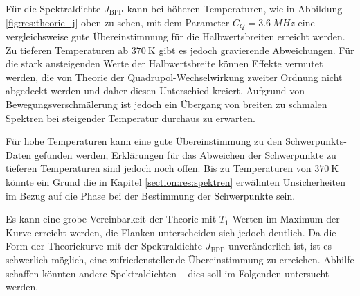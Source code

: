 Für die Spektraldichte $J_\text{BPP}$ kann bei höheren Temperaturen, wie in Abbildung \ref{fig:res:theorie_j} oben zu sehen, mit dem Parameter $C_Q = \SI{3.6}{MHz}$ eine vergleichsweise gute Übereinstimmung für die Halbwertsbreiten erreicht werden. Zu tieferen Temperaturen ab $\SI{370}{\kelvin}$ gibt es jedoch gravierende Abweichungen. Für die stark ansteigenden Werte der Halbwertsbreite können Effekte vermutet werden, die von Theorie der Quadrupol-Wechselwirkung zweiter Ordnung nicht abgedeckt werden und daher diesen Unterschied kreiert. Aufgrund von Bewegungsverschmälerung ist jedoch ein Übergang von breiten zu schmalen Spektren bei steigender Temperatur durchaus zu erwarten.

Für hohe Temperaturen kann eine gute Übereinstimmung zu den Schwerpunkts-Daten gefunden werden, Erklärungen für das Abweichen der Schwerpunkte zu tieferen Temperaturen sind jedoch noch offen. Bis zu Temperaturen von $\SI{370}{\kelvin}$ könnte ein Grund die in Kapitel \ref{section:res:spektren} erwähnten Unsicherheiten im Bezug auf die Phase bei der Bestimmung der Schwerpunkte sein.

Es kann eine grobe Vereinbarkeit der Theorie mit $T_1$-Werten im Maximum der Kurve erreicht werden, die Flanken unterscheiden sich jedoch deutlich. Da die Form der Theoriekurve mit der Spektraldichte $J_\text{BPP}$ unveränderlich ist, ist es schwerlich möglich, eine zufriedenstellende Übereinstimmung zu erreichen. Abhilfe schaffen könnten andere Spektraldichten -- dies soll im Folgenden untersucht werden.

